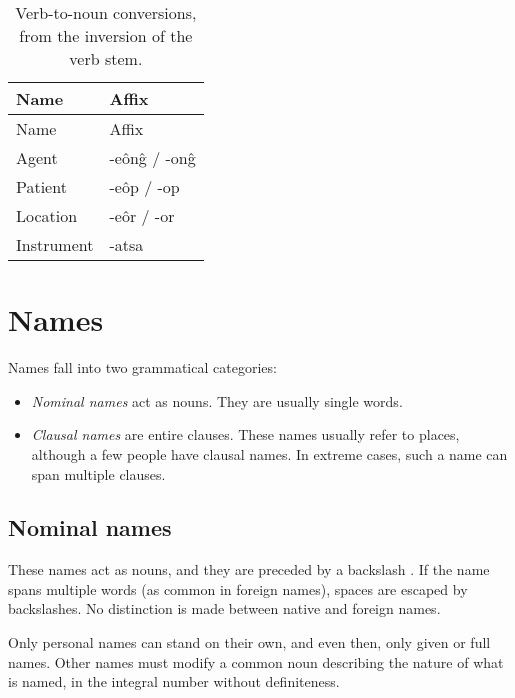 \documentclass{book}
\begin{document}
\begin{longtable}[c]{|l|>{\kardinal}l|}
    \caption{Verb-to-noun conversions, from the inversion of the verb stem.} \\
    
    \hline
    Name & \textnormal{Affix} \\
    \hline
    \endfirsthead
    
    \hline
    Name & \textnormal{Affix} \\
    \hline
    \endhead
    
    \hline
    \endfoot
    
    \hline
    \endlastfoot
    
    Agent & -e\^on\^g / -on\^g \\
    Patient & -e\^op / -op \\
    Location & -e\^or / -or \\
    Instrument & -atsa \\
\end{longtable}

\chapter{Names}

Names fall into two grammatical categories:

\begin{itemize}
    \item \emph{Nominal names} act as nouns. They are usually single words.
    \item \emph{Clausal names} are entire clauses. These names usually refer to places, although a few people have clausal names. In extreme cases, such a name can span multiple clauses.
\end{itemize}

\section{Nominal names}

These names act as nouns, and they are preceded by a backslash \hortho{\bs}. If the name spans multiple words (as common in foreign names), spaces are escaped by backslashes. No distinction is made between native and foreign names.

Only personal names can stand on their own, and even then, only given or full names. Other names must modify a common noun describing the nature of what is named, in the integral number without definiteness.
\end{document}

